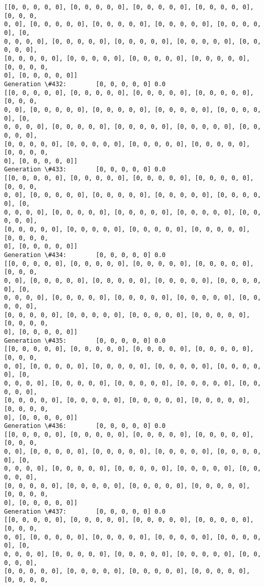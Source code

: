 \documentclass[11pt]{article}
\begin{document}
\begin{Verbatim}[commandchars=\\\{\}]
[[0, 0, 0, 0, 0], [0, 0, 0, 0, 0], [0, 0, 0, 0, 0], [0, 0, 0, 0, 0], [0, 0, 0,
0, 0], [0, 0, 0, 0, 0], [0, 0, 0, 0, 0], [0, 0, 0, 0, 0], [0, 0, 0, 0, 0], [0,
0, 0, 0, 0], [0, 0, 0, 0, 0], [0, 0, 0, 0, 0], [0, 0, 0, 0, 0], [0, 0, 0, 0, 0],
[0, 0, 0, 0, 0], [0, 0, 0, 0, 0], [0, 0, 0, 0, 0], [0, 0, 0, 0, 0], [0, 0, 0, 0,
0], [0, 0, 0, 0, 0]]
Generation \#432:        [0, 0, 0, 0, 0] 0.0
[[0, 0, 0, 0, 0], [0, 0, 0, 0, 0], [0, 0, 0, 0, 0], [0, 0, 0, 0, 0], [0, 0, 0,
0, 0], [0, 0, 0, 0, 0], [0, 0, 0, 0, 0], [0, 0, 0, 0, 0], [0, 0, 0, 0, 0], [0,
0, 0, 0, 0], [0, 0, 0, 0, 0], [0, 0, 0, 0, 0], [0, 0, 0, 0, 0], [0, 0, 0, 0, 0],
[0, 0, 0, 0, 0], [0, 0, 0, 0, 0], [0, 0, 0, 0, 0], [0, 0, 0, 0, 0], [0, 0, 0, 0,
0], [0, 0, 0, 0, 0]]
Generation \#433:        [0, 0, 0, 0, 0] 0.0
[[0, 0, 0, 0, 0], [0, 0, 0, 0, 0], [0, 0, 0, 0, 0], [0, 0, 0, 0, 0], [0, 0, 0,
0, 0], [0, 0, 0, 0, 0], [0, 0, 0, 0, 0], [0, 0, 0, 0, 0], [0, 0, 0, 0, 0], [0,
0, 0, 0, 0], [0, 0, 0, 0, 0], [0, 0, 0, 0, 0], [0, 0, 0, 0, 0], [0, 0, 0, 0, 0],
[0, 0, 0, 0, 0], [0, 0, 0, 0, 0], [0, 0, 0, 0, 0], [0, 0, 0, 0, 0], [0, 0, 0, 0,
0], [0, 0, 0, 0, 0]]
Generation \#434:        [0, 0, 0, 0, 0] 0.0
[[0, 0, 0, 0, 0], [0, 0, 0, 0, 0], [0, 0, 0, 0, 0], [0, 0, 0, 0, 0], [0, 0, 0,
0, 0], [0, 0, 0, 0, 0], [0, 0, 0, 0, 0], [0, 0, 0, 0, 0], [0, 0, 0, 0, 0], [0,
0, 0, 0, 0], [0, 0, 0, 0, 0], [0, 0, 0, 0, 0], [0, 0, 0, 0, 0], [0, 0, 0, 0, 0],
[0, 0, 0, 0, 0], [0, 0, 0, 0, 0], [0, 0, 0, 0, 0], [0, 0, 0, 0, 0], [0, 0, 0, 0,
0], [0, 0, 0, 0, 0]]
Generation \#435:        [0, 0, 0, 0, 0] 0.0
[[0, 0, 0, 0, 0], [0, 0, 0, 0, 0], [0, 0, 0, 0, 0], [0, 0, 0, 0, 0], [0, 0, 0,
0, 0], [0, 0, 0, 0, 0], [0, 0, 0, 0, 0], [0, 0, 0, 0, 0], [0, 0, 0, 0, 0], [0,
0, 0, 0, 0], [0, 0, 0, 0, 0], [0, 0, 0, 0, 0], [0, 0, 0, 0, 0], [0, 0, 0, 0, 0],
[0, 0, 0, 0, 0], [0, 0, 0, 0, 0], [0, 0, 0, 0, 0], [0, 0, 0, 0, 0], [0, 0, 0, 0,
0], [0, 0, 0, 0, 0]]
Generation \#436:        [0, 0, 0, 0, 0] 0.0
[[0, 0, 0, 0, 0], [0, 0, 0, 0, 0], [0, 0, 0, 0, 0], [0, 0, 0, 0, 0], [0, 0, 0,
0, 0], [0, 0, 0, 0, 0], [0, 0, 0, 0, 0], [0, 0, 0, 0, 0], [0, 0, 0, 0, 0], [0,
0, 0, 0, 0], [0, 0, 0, 0, 0], [0, 0, 0, 0, 0], [0, 0, 0, 0, 0], [0, 0, 0, 0, 0],
[0, 0, 0, 0, 0], [0, 0, 0, 0, 0], [0, 0, 0, 0, 0], [0, 0, 0, 0, 0], [0, 0, 0, 0,
0], [0, 0, 0, 0, 0]]
Generation \#437:        [0, 0, 0, 0, 0] 0.0
[[0, 0, 0, 0, 0], [0, 0, 0, 0, 0], [0, 0, 0, 0, 0], [0, 0, 0, 0, 0], [0, 0, 0,
0, 0], [0, 0, 0, 0, 0], [0, 0, 0, 0, 0], [0, 0, 0, 0, 0], [0, 0, 0, 0, 0], [0,
0, 0, 0, 0], [0, 0, 0, 0, 0], [0, 0, 0, 0, 0], [0, 0, 0, 0, 0], [0, 0, 0, 0, 0],
[0, 0, 0, 0, 0], [0, 0, 0, 0, 0], [0, 0, 0, 0, 0], [0, 0, 0, 0, 0], [0, 0, 0, 0,

\end{Verbatim}
\end{document}
